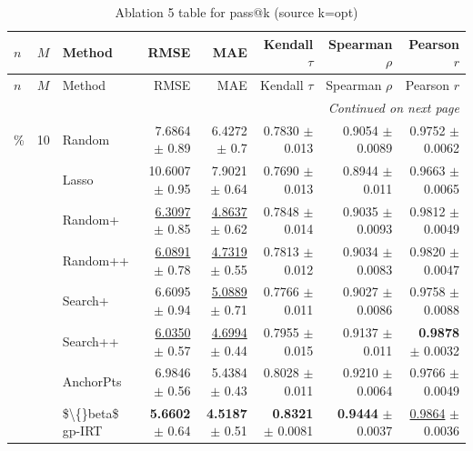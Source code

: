 \footnotesize
\setlength{\tabcolsep}{2pt}
\renewcommand{\arraystretch}{1.05}
\setlength{\LTpre}{0pt}
\setlength{\LTpost}{0pt}
\setlength{\LTleft}{\fill}
\setlength{\LTright}{\fill}
\begin{longtable}{llp{}rrrrr}
\caption{Ablation 5 table for pass@k (source k=opt)}\label{tab:ablation\_5\_passk\_kopt}\\
\toprule
$n$ & $M$ & Method & RMSE & MAE & Kendall $\tau$ & Spearman $\rho$ & Pearson $r$ \\
\midrule
\endfirsthead
\toprule
$n$ & $M$ & Method & RMSE & MAE & Kendall $\tau$ & Spearman $\rho$ & Pearson $r$ \\
\midrule
\endhead
\midrule
\multicolumn{8}{r}{\emph{Continued on next page}} \\
\midrule
\endfoot
\bottomrule
\endlastfoot
5\% & 10 & Random & 7.6864 {\scriptsize $\pm$ 0.89} & 6.4272 {\scriptsize $\pm$ 0.7} & 0.7830 {\scriptsize $\pm$ 0.013} & 0.9054 {\scriptsize $\pm$ 0.0089} & 0.9752 {\scriptsize $\pm$ 0.0062} \\
 &  & Lasso & 10.6007 {\scriptsize $\pm$ 0.95} & 7.9021 {\scriptsize $\pm$ 0.64} & 0.7690 {\scriptsize $\pm$ 0.013} & 0.8944 {\scriptsize $\pm$ 0.011} & 0.9663 {\scriptsize $\pm$ 0.0065} \\
 &  & Random+ & \underline{6.3097} {\scriptsize $\pm$ 0.85} & \underline{4.8637} {\scriptsize $\pm$ 0.62} & 0.7848 {\scriptsize $\pm$ 0.014} & 0.9035 {\scriptsize $\pm$ 0.0093} & 0.9812 {\scriptsize $\pm$ 0.0049} \\
 &  & Random++ & \underline{6.0891} {\scriptsize $\pm$ 0.78} & \underline{4.7319} {\scriptsize $\pm$ 0.55} & 0.7813 {\scriptsize $\pm$ 0.012} & 0.9034 {\scriptsize $\pm$ 0.0083} & 0.9820 {\scriptsize $\pm$ 0.0047} \\
 &  & Search+ & 6.6095 {\scriptsize $\pm$ 0.94} & \underline{5.0889} {\scriptsize $\pm$ 0.71} & 0.7766 {\scriptsize $\pm$ 0.011} & 0.9027 {\scriptsize $\pm$ 0.0086} & 0.9758 {\scriptsize $\pm$ 0.0088} \\
 &  & Search++ & \underline{6.0350} {\scriptsize $\pm$ 0.57} & \underline{4.6994} {\scriptsize $\pm$ 0.44} & 0.7955 {\scriptsize $\pm$ 0.015} & 0.9137 {\scriptsize $\pm$ 0.011} & \textbf{0.9878} {\scriptsize $\pm$ 0.0032} \\
 &  & AnchorPts & 6.9846 {\scriptsize $\pm$ 0.56} & 5.4384 {\scriptsize $\pm$ 0.43} & 0.8028 {\scriptsize $\pm$ 0.011} & 0.9210 {\scriptsize $\pm$ 0.0064} & 0.9766 {\scriptsize $\pm$ 0.0049} \\
 &  & \$\textbackslash\{\}beta\$ gp-IRT & \textbf{5.6602} {\scriptsize $\pm$ 0.64} & \textbf{4.5187} {\scriptsize $\pm$ 0.51} & \textbf{0.8321} {\scriptsize $\pm$ 0.0081} & \textbf{0.9444} {\scriptsize $\pm$ 0.0037} & \underline{0.9864} {\scriptsize $\pm$ 0.0036} \\

\end{longtable}

